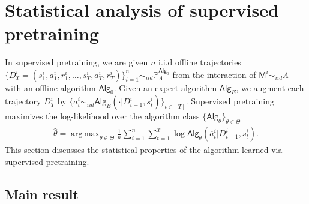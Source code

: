 \documentclass[10pt]{article}
\DeclareMathOperator*{\argmax}{arg\,max}
\newcommand{\<}{\left\langle}
\renewcommand{\>}{\right\rangle}
\renewcommand{\P}{\mathbb{P}}
\newcommand{\inst}{{\mathsf{M}}}
\newcommand{\trajsp}{{\mathcal{T}}}
\newcommand{\widebar}[1]{\overline{#1}}
\newcommand{\state}{{s}}
\newcommand{\action}{{a}}
\newcommand{\eaction}{{\widebar{a}}}%
\newcommand{\reward}{{r}}
\newcommand{\totlen}{{T}} %
\newcommand{\ith}{{i}}
\newcommand{\sAlg}{{\mathsf{Alg}}}
\newcommand{\dset}{{D}}
\newcommand{\Numobs}{{n}}   %
\newcommand{\Par}{{\theta}}
\newcommand{\Parspace}{{\Theta}}
\newcommand{\EstPar}{{\widehat{\theta}}}
\newcommand{\prior}{{\Lambda}}
\newcommand{\actionsp}{{\mathcal{A}}}
\newcommand{\shortexp}{{E}}
\begin{document}
\section{Statistical analysis of supervised pretraining}\label{sec:supervised-pretraining}

In supervised pretraining, we are given $\Numobs$ i.i.d offline trajectories $\{\dset^\ith_\totlen =  (\state^\ith_1,\action^\ith_1, \reward^\ith_1, \ldots, \state^\ith_\totlen, \allowbreak \action^\ith_\totlen, \allowbreak\reward^\ith_\totlen) \}_{i=1}^\Numobs \sim_{iid} \P_\prior^{\sAlg_0}$ from the interaction of $\inst^\ith \sim_{iid} \prior$ with an offline algorithm $\sAlg_0$. Given an expert algorithm $\sAlg_{\shortexp}$, we augment each trajectory $\dset_{\totlen}^i$ by $\{ \eaction_t^i \sim_{iid} \sAlg_{\shortexp}( \cdot |\dset_{t-1}^i, \state_t^i)\}_{t \in [\totlen]}$. Supervised pretraining maximizes the log-likelihood over the algorithm class $\{ \sAlg_\Par\}_{\Par\in\Parspace}$
\begin{align}
\EstPar=\argmax_{\Par\in\Parspace}  \frac{1}{\Numobs}\sum_{i=1}^\Numobs\sum_{t=1}^\totlen\log \sAlg_\Par(\eaction^\ith_{t}|\dset_{t-1}^\ith,\state^\ith_t). \label{eq:general_mle}
\end{align}
This section discusses the statistical properties of the algorithm learned via supervised pretraining. 




\subsection{Main result}
\end{document}

